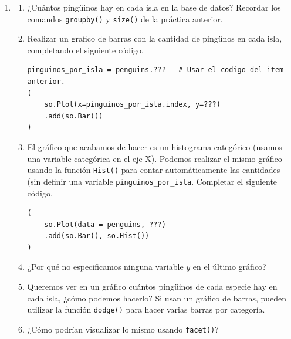 \documentclass[a4paper,11pt]{article}
\theoremstyle{definition}
\begin{document}
\begin{enumerate}[resume]
?`Qu\'e resultado esperan para el siguiente gráfico? ?`Cu\'ales codificaciones se pasan de \lstinline{Plot()} a \lstinline{Dot()} y cuáles no pueden pasarse? ¿Cuáles codificaciones se establecen en \lstinline{Dot()}? ¿Cuáles variables están asignadas directamente en \lstinline{Dot()}? ¿De qué color van a pintarse los puntos?



\begin{lstlisting}
(
    so.Plot(
        penguins, x="bill_length_mm", y="bill_depth_mm",
        edgewidth="body_mass_g", marker = "species",
        linestyle = "island", color = "species"
    )
    .add(so.Dot(color=".8"), edgecolor="sex")
)
\end{lstlisting}

\item 
\begin{enumerate}
\item ¿Cuántos pingüinos hay en cada isla en la base de datos? Recordar los comandos \lstinline{groupby()} y \lstinline{size()} de la práctica anterior.
\item Realizar un grafico de barras con la cantidad de pingünos en cada isla, completando el siguiente código.
\begin{lstlisting}
pinguinos_por_isla = penguins.???   # Usar el codigo del item anterior.
(
    so.Plot(x=pinguinos_por_isla.index, y=???)
    .add(so.Bar())
)
\end{lstlisting}
\item El gráfico que acabamos de hacer es un histograma categórico (usamos una variable categórica en el eje X). Podemos realizar el mismo gráfico usando la función \lstinline{Hist()} para contar automáticamente las cantidades (sin definir una variable \lstinline{pinguinos_por_isla}. Completar el siguiente código.
\begin{lstlisting}
(
    so.Plot(data = penguins, ???)
    .add(so.Bar(), so.Hist())
)
\end{lstlisting}
\item ¿Por qué no especificamos ninguna variable $y$ en el último gráfico?
\item Queremos ver en un gráfico cuántos pingüinos de cada especie hay en cada isla, ¿cómo podemos hacerlo? Si usan un gráfico de barras, pueden utilizar la función \lstinline{dodge()} para hacer varias barras por categoría.
\item ¿Cómo podrían visualizar lo mismo usando \lstinline{facet()}?
\end{enumerate}


\end{enumerate}
\end{document}
